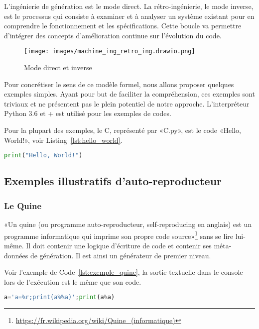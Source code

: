 L’ingénierie de génération est le mode direct. La rétro-ingénierie, le mode inverse, est le processus qui consiste à examiner et à analyser un système existant pour en comprendre le fonctionnement et les spécifications. Cette boucle va permettre d’intégrer des concepts d’amélioration continue sur l’évolution du code.

\begin{figure}[htb]
\centering
\texttt{[image: images/machine\_ing\_retro\_ing.drawio.png]}
\caption{Mode direct et inverse}
\label{fig:mode_direct_inverse}
\end{figure}

Pour concrétiser le sens de ce modèle formel, nous allons proposer quelques exemples simples. Ayant pour but de faciliter la compréhension, ces exemples sont triviaux et ne présentent pas le plein potentiel de notre approche. L’interpréteur Python 3.6 et + est utilisé pour les exemples de codes.

Pour la plupart des exemples, le C, représenté par «C.py», est le code «Hello, World!», voir Listing~\ref{lst:hello_world}.

\begin{lstlisting}[language=Python, upquote=true, caption={Exemple de code Hello, World!}, label={lst:hello_world}]
print("Hello, World!")
\end{lstlisting}

\subsection{Exemples illustratifs d’auto-reproducteur}

\subsubsection{Le Quine}

«Un quine\cite{sarkar2020quines} (ou programme auto-reproducteur, self-reproducing en anglais) est un programme informatique qui imprime son propre code source»\footnote{\url{https://fr.wikipedia.org/wiki/Quine_(informatique)}} sans se lire lui-même. Il doit contenir une logique d’écriture de code et contenir ses méta-données de génération. Il est ainsi un générateur de premier niveau.


Voir l'exemple de Code~\ref{lst:exemple_quine}, la sortie textuelle dans le console lors de l'exécution est le même que son code.

\begin{lstlisting}[language=Python, upquote=true, caption={Exemple de code Quine}, label={lst:exemple_quine}]
a='a=%r;print(a%%a)';print(a%a)
\end{lstlisting}

